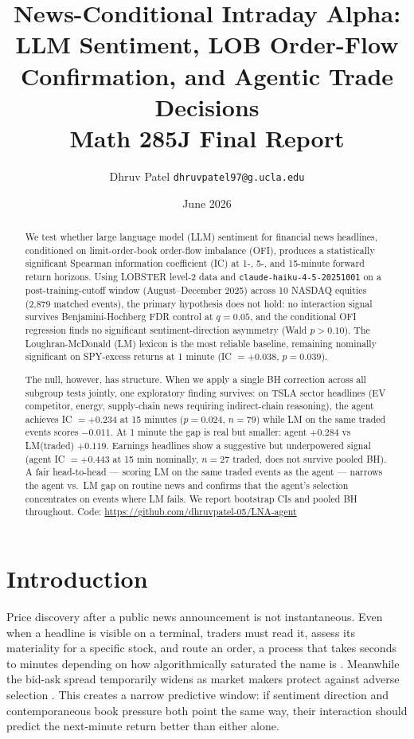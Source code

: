 \documentclass[11pt, letterpaper]{article}
\title{\textbf{News-Conditional Intraday Alpha:}\\
       LLM Sentiment, LOB Order-Flow Confirmation, and Agentic Trade Decisions\\[0.4em]
       \normalsize Math 285J Final Report}
\author{Dhruv Patel \quad {\small UCLA Mathematics} \quad
        {\small \texttt{dhruvpatel97@g.ucla.edu}}}
\date{June 2026}
\begin{document}
\maketitle

\begin{abstract}
We test whether large language model (LLM) sentiment for financial news headlines,
conditioned on limit-order-book order-flow imbalance (OFI), produces a statistically
significant Spearman information coefficient (IC) at 1-, 5-, and 15-minute forward
return horizons. Using LOBSTER level-2 data and \texttt{claude-haiku-4-5-20251001}
on a post-training-cutoff window (August--December 2025) across 10 NASDAQ equities
(2,879 matched events), the primary hypothesis does not hold: no interaction signal
survives Benjamini-Hochberg FDR control at $q = 0.05$, and the conditional OFI
regression finds no significant sentiment-direction asymmetry (Wald $p > 0.10$). The
Loughran-McDonald (LM) lexicon is the most reliable baseline, remaining nominally
significant on SPY-excess returns at 1 minute (IC $= +0.038$, $p = 0.039$).

The null, however, has structure. When we apply a single BH correction across all
subgroup tests jointly, one exploratory finding survives: on TSLA sector headlines
(EV competitor, energy, supply-chain news requiring indirect-chain reasoning), the
agent achieves IC $= +0.234$ at 15 minutes ($p = 0.024$, $n = 79$) while LM on
the same traded events scores $-0.011$. At 1 minute the gap is real but smaller:
agent $+0.284$ vs LM(traded) $+0.119$. Earnings headlines show a suggestive but underpowered signal (agent IC
$= +0.443$ at 15 min nominally, $n = 27$ traded, does not survive pooled BH). A
fair head-to-head --- scoring LM on the same traded events as the agent --- narrows
the agent vs.\ LM gap on routine news and confirms that the agent's selection
concentrates on events where LM fails. We report bootstrap CIs and pooled BH
throughout.
Code: \url{https://github.com/dhruvpatel-05/LNA-agent}
\end{abstract}

\tableofcontents
\newpage

\section{Introduction}
\label{sec:intro}

Price discovery after a public news announcement is not instantaneous. Even when a
headline is visible on a terminal, traders must read it, assess its materiality for
a specific stock, and route an order, a process that takes seconds to minutes
depending on how algorithmically saturated the name is \citep{grossklussmann2011machines,
riordan2013public}. Meanwhile the bid-ask spread temporarily widens as market makers
protect against adverse selection \citep{cont2014price}. This creates a narrow
predictive window: if sentiment direction and contemporaneous book pressure both point
the same way, their interaction should predict the next-minute return better than
either alone.
\end{document}
